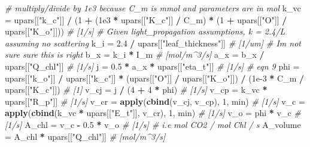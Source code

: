\documentclass[12pt,halfline,a4paper,]{ouparticle}
\newenvironment{Shaded}{\begin{snugshade}}{\end{snugshade}}
\newcommand{\CommentTok}[1]{\textcolor[rgb]{0.56,0.35,0.01}{\textit{#1}}}
\newcommand{\DecValTok}[1]{\textcolor[rgb]{0.00,0.00,0.81}{#1}}
\newcommand{\FloatTok}[1]{\textcolor[rgb]{0.00,0.00,0.81}{#1}}
\newcommand{\FunctionTok}[1]{\textcolor[rgb]{0.13,0.29,0.53}{\textbf{#1}}}
\newcommand{\NormalTok}[1]{#1}
\newcommand{\OtherTok}[1]{\textcolor[rgb]{0.56,0.35,0.01}{#1}}
\newcommand{\SpecialCharTok}[1]{\textcolor[rgb]{0.81,0.36,0.00}{\textbf{#1}}}
\newcommand{\StringTok}[1]{\textcolor[rgb]{0.31,0.60,0.02}{#1}}
\begin{document}
\begin{Shaded}
\begin{Highlighting}[]
\CommentTok{\# multiply/divide by 1e3 because C\_m is mmol and parameters are in mol}
\NormalTok{k\_vc }\OtherTok{=}\NormalTok{ upars[[}\StringTok{"k\_c"}\NormalTok{]] }\SpecialCharTok{/}\NormalTok{ (}\DecValTok{1} \SpecialCharTok{+}\NormalTok{ (}\FloatTok{1e3} \SpecialCharTok{*}\NormalTok{ upars[[}\StringTok{"K\_c"}\NormalTok{]] }\SpecialCharTok{/}\NormalTok{ C\_m) }\SpecialCharTok{*}
\NormalTok{                           (}\DecValTok{1} \SpecialCharTok{+}\NormalTok{ upars[[}\StringTok{"O"}\NormalTok{]] }\SpecialCharTok{/}\NormalTok{ upars[[}\StringTok{"K\_o"}\NormalTok{]])) }\CommentTok{\# [1/s]}
\CommentTok{\# Given light\_propagation assumptions, k = 2.4/L assuming no scattering}
\NormalTok{k\_i }\OtherTok{=} \FloatTok{2.4} \SpecialCharTok{/}\NormalTok{ upars[[}\StringTok{"leaf\_thickness"}\NormalTok{]] }\CommentTok{\# [1/um] \# I\textquotesingle{}m not sure sure this is right}
\NormalTok{b\_x }\OtherTok{=}\NormalTok{ k\_i }\SpecialCharTok{*}\NormalTok{ I\_m }\CommentTok{\# [mol/m\^{}3/s]}
\NormalTok{a\_x }\OtherTok{=}\NormalTok{ b\_x }\SpecialCharTok{/}\NormalTok{ upars[[}\StringTok{"Q\_chl"}\NormalTok{]] }\CommentTok{\# [1/s]}
\NormalTok{j }\OtherTok{=} \FloatTok{0.5} \SpecialCharTok{*}\NormalTok{ a\_x }\SpecialCharTok{*}\NormalTok{ upars[[}\StringTok{"eta\_t"}\NormalTok{]] }\CommentTok{\# [1/s] \# eqn 9}
\NormalTok{phi }\OtherTok{=}\NormalTok{ upars[[}\StringTok{"k\_o"}\NormalTok{]] }\SpecialCharTok{/}\NormalTok{ upars[[}\StringTok{"k\_c"}\NormalTok{]] }\SpecialCharTok{*}\NormalTok{ (upars[[}\StringTok{"O"}\NormalTok{]] }\SpecialCharTok{/}\NormalTok{ upars[[}\StringTok{"K\_o"}\NormalTok{]]) }\SpecialCharTok{/}
\NormalTok{  (}\FloatTok{1e{-}3} \SpecialCharTok{*}\NormalTok{ C\_m }\SpecialCharTok{/}\NormalTok{ upars[[}\StringTok{"K\_c"}\NormalTok{]]) }\CommentTok{\# [1]}
\NormalTok{v\_cj }\OtherTok{=}\NormalTok{ j }\SpecialCharTok{/}\NormalTok{ (}\DecValTok{4} \SpecialCharTok{+} \DecValTok{4} \SpecialCharTok{*}\NormalTok{ phi) }\CommentTok{\# [1/s]}
\NormalTok{v\_cp }\OtherTok{=}\NormalTok{ k\_vc }\SpecialCharTok{*}\NormalTok{ upars[[}\StringTok{"R\_p"}\NormalTok{]] }\CommentTok{\# [1/s]}
\NormalTok{v\_cr }\OtherTok{=} \FunctionTok{apply}\NormalTok{(}\FunctionTok{cbind}\NormalTok{(v\_cj, v\_cp), }\DecValTok{1}\NormalTok{, min) }\CommentTok{\# [1/s]}
\NormalTok{v\_c }\OtherTok{=} \FunctionTok{apply}\NormalTok{(}\FunctionTok{cbind}\NormalTok{(k\_vc }\SpecialCharTok{*}\NormalTok{ upars[[}\StringTok{"E\_t"}\NormalTok{]], v\_cr), }\DecValTok{1}\NormalTok{, min) }\CommentTok{\# [1/s]}
\NormalTok{v\_o }\OtherTok{=}\NormalTok{ phi }\SpecialCharTok{*}\NormalTok{ v\_c }\CommentTok{\# [1/s]}
\NormalTok{A\_chl }\OtherTok{=}\NormalTok{ v\_c }\SpecialCharTok{{-}} \FloatTok{0.5} \SpecialCharTok{*}\NormalTok{ v\_o }\CommentTok{\# [1/s] \# i.e mol CO2 / mol Chl / s}
\NormalTok{A\_volume }\OtherTok{=}\NormalTok{ A\_chl }\SpecialCharTok{*}\NormalTok{ upars[[}\StringTok{"Q\_chl"}\NormalTok{]] }\CommentTok{\# [mol/m\^{}3/s]}
\end{Highlighting}
\end{Shaded}
\end{document}
